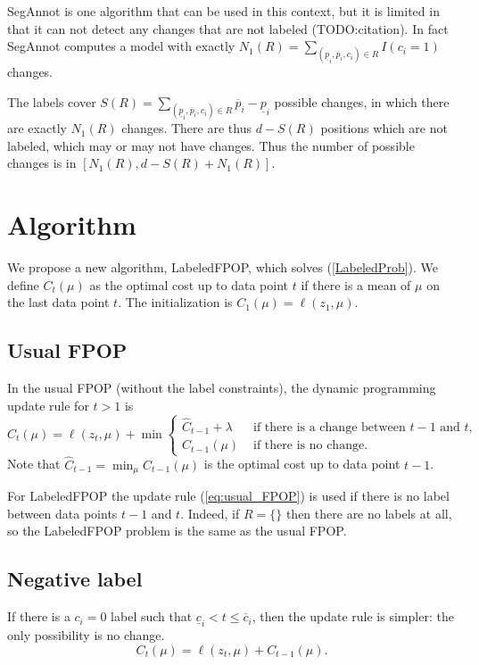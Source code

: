 \documentclass{article}
\begin{document}
SegAnnot is one algorithm that can be used in this context, but it is
limited in that it can not detect any changes that are not labeled
(TODO:citation). In fact SegAnnot computes a model with exactly
$N_1(R)=\sum_{(\underline p_i, \overline p_i, c_i)\in R} I(c_i=1)$ changes.

The labels cover
$S(R)=\sum_{(\underline p_i, \overline p_i, c_i)\in R} \overline
p_i-\underline p_i$ possible changes, in which there are exactly
$N_1(R)$ changes. There are thus $d-S(R)$ positions which are not
labeled, which may or may not have changes. Thus the number of
possible changes is in $[N_1(R), d-S(R)+N_1(R)]$.

\section{Algorithm}

We propose a new algorithm, LabeledFPOP, which solves
(\ref{LabeledProb}). We define $C_t(\mu)$ as the optimal cost up to
data point $t$ if there is a mean of $\mu$ on the last data point
$t$. The initialization is $C_1(\mu)= \ell(z_1, \mu)$. 

\subsection{Usual FPOP}
In the usual
FPOP (without the label constraints), the dynamic programming update
rule for $t>1$ is
\begin{equation}
  \label{eq:usual_FPOP}
  C_t(\mu)=\ell(z_t, \mu) + \min
  \begin{cases}
\hat C_{t-1}+\lambda &\text{ if there is a change between $t-1$ and $t$,}\\
C_{t-1}(\mu) & \text{ if there is no change.}
  \end{cases}
\end{equation}
Note that $\hat C_{t-1}=\min_\mu C_{t-1}(\mu)$ is the optimal cost up
to data point $t-1$.

For LabeledFPOP the update rule (\ref{eq:usual_FPOP}) is used if there
is no label between data points $t-1$ and $t$. Indeed, if $R=\{\}$
then there are no labels at all, so the LabeledFPOP problem is the
same as the usual FPOP.

\subsection{Negative label}
If there is a $c_i=0$ label such that
$\underline c_i < t \leq \overline c_i$, then the update rule is
simpler: the only possibility is no change.
\begin{equation}
  \label{eq:negative_update}
  C_t(\mu)=\ell(z_t,\mu)+
C_{t-1}(\mu).
\end{equation}
\end{document}
